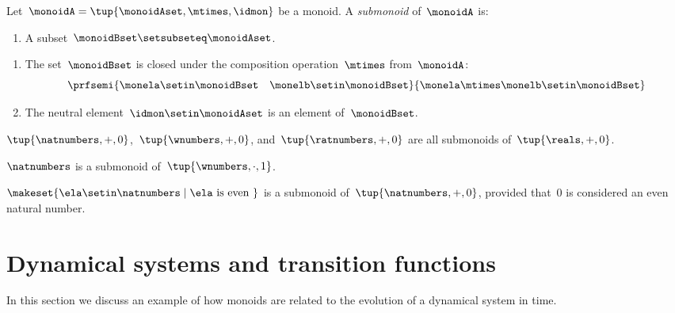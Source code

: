 \begin{definition}
    Let~$\monoidA = \tup{\monoidAset, \mtimes, \idmon}$ be a monoid.
    A \emph{submonoid} of~$\monoidA$ is:

    \constit

    \begin{enumerate}
        \item A subset~$\monoidBset \setsubseteq \monoidAset$.
    \end{enumerate}

    \condit

    \begin{enumerate}
        \item The set~$\monoidBset$ is closed under the composition operation~$\mtimes$ from~$\monoidA$:
              \begin{equation}
                  \prfsemi{\monela \setin \monoidBset \quad \monelb \setin \monoidBset}{\monela \mtimes \monelb \setin \monoidBset}
              \end{equation}

        \item The neutral element~$\idmon \setin \monoidAset$ is an element of~$\monoidBset$.
    \end{enumerate}
\end{definition}

\begin{example}
    $\tup{\natnumbers, +,0}$,~$\tup{\wnumbers, +,0}$, and~$\tup{\ratnumbers, +,0}$ are all submonoids of~$\tup{\reals, +,0}$.
\end{example}

\begin{example}
    $\natnumbers$ is a submonoid of~$\tup{\wnumbers, \cdot, 1}$.
\end{example}

\begin{example}
    $\makeset{ \ela \setin \natnumbers \mid \ela \text{ is even } }$ is a submonoid of~$\tup{\natnumbers, +,0}$, provided that~$0$ is considered an even natural number.
\end{example}

\section[Dynamical systems]{Dynamical systems and transition functions}


In this section we discuss an example of how monoids are related to the evolution of a dynamical system in time.

